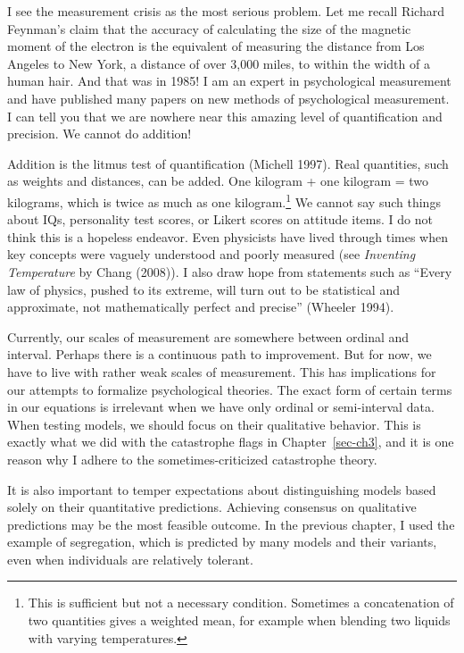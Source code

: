 \documentclass[
  a4paper,
  DIV=11,
  numbers=noendperiod,
  oneside]{scrreprt}
\begin{document}
I see the measurement crisis as the most serious problem. Let me recall
Richard Feynman's claim that the accuracy of calculating the size of the
magnetic moment of the electron is the equivalent of measuring the
distance from Los Angeles to New York, a distance of over 3,000 miles,
to within the width of a human hair. And that was in 1985! I am an
expert in psychological measurement and have published many papers on
new methods of psychological measurement. I can tell you that we are
nowhere near this amazing level of quantification and precision. We
cannot do addition!

Addition is the litmus test of quantification (Michell 1997). Real
quantities, such as weights and distances, can be added. One kilogram +
one kilogram = two kilograms, which is twice as much as one
kilogram.\footnote{This is sufficient but not a necessary condition.
  Sometimes a concatenation of two quantities gives a weighted mean, for
  example when blending two liquids with varying temperatures.} We
cannot say such things about IQs, personality test scores, or Likert
scores on attitude items. I do not think this is a hopeless endeavor.
Even physicists have lived through times when key concepts were vaguely
understood and poorly measured (see \emph{Inventing Temperature} by
Chang (2008)). I also draw hope from statements such as ``Every law of
physics, pushed to its extreme, will turn out to be statistical and
approximate, not mathematically perfect and precise'' (Wheeler 1994).

Currently, our scales of measurement are somewhere between ordinal and
interval. Perhaps there is a continuous path to improvement. But for
now, we have to live with rather weak scales of measurement. This has
implications for our attempts to formalize psychological theories. The
exact form of certain terms in our equations is irrelevant when we have
only ordinal or semi-interval data. When testing models, we should focus
on their qualitative behavior. This is exactly what we did with the
catastrophe flags in Chapter~\ref{sec-ch3}, and it is one reason why I
adhere to the sometimes-criticized catastrophe theory.

It is also important to temper expectations about distinguishing models
based solely on their quantitative predictions. Achieving consensus on
qualitative predictions may be the most feasible outcome. In the
previous chapter, I used the example of segregation, which is predicted
by many models and their variants, even when individuals are relatively
tolerant.
\end{document}
